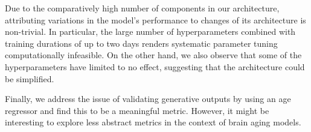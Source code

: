 Due to the comparatively high number of components in our architecture, attributing variations in the model's performance to changes of its architecture is non-trivial.
In particular, the large number of hyperparameters combined with training durations of up to two days renders systematic parameter tuning computationally infeasible. On the other hand, we also observe that some of the hyperparameters have limited to no effect, suggesting that the architecture could be simplified.

Finally, we address the issue of validating generative outputs by using an age regressor and find this to be a meaningful metric. However, it might be interesting to explore less abstract metrics in the context of brain aging models.

